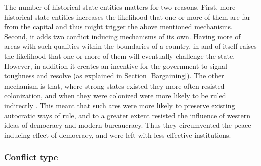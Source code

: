 The number of historical state entities matters for two reasons. First, more
historical state entities increases the likelihood that one or more of them are
far from the capital and thus might trigger the above mentioned mechanisms.
Second, it adds two conflict inducing mechanisms of its own. Having more of
areas with such qualities within the boundaries of a country, in and of itself
raises the likelihood that one or more of them will eventually challenge the
state. However, in addition it creates an incentive for the government to signal
toughness and resolve (as explained in Section \ref{Bargaining}). The other
mechanism is that, where strong states existed they more often resisted
colonization, and when they were colonized were more likely to be ruled
indirectly \citep{Englebert2000, Gerring2011, Hariri2012}. This meant that such
ares were more likely to preserve existing autocratic ways of rule, and to a
greater extent resisted the influence of western ideas of democracy and modern
bureaucracy. Thus they circumvented the peace inducing effect of democracy, and
were left with less effective institutions.

\subsubsection{Conflict type} \label{Conflict type}

